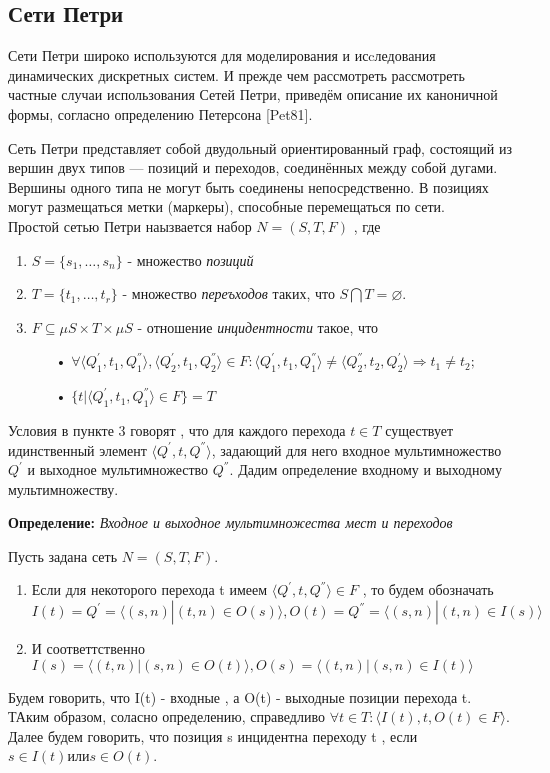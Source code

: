 \documentclass[a4paper,14pt]{article}
\begin{document}
\subsection{Сети Петри}
Сети Петри широко используются для моделирования и исcледования динамических дискретных систем. 
И прежде чем рассмотреть рассмотреть частные случаи использования Сетей Петри, приведём описание их каноничной формы, согласно определению Петерсона [Pet81].
\par Сеть Петри представляет собой двудольный ориентированный граф, состоящий из вершин двух типов — позиций и переходов, соединённых между собой дугами. Вершины одного типа не могут быть соединены непосредственно. В позициях могут размещаться метки (маркеры), способные перемещаться по сети.\\
Простой сетью Петри наызвается набор $N = (S,T,F)$ , где
\begin{enumerate}
\item $S = \lbrace s_{1},\ldots,s_{n} \rbrace$ - множество \textit{позиций}
\item $T = \lbrace t_{1},\ldots,t_{r} \rbrace$ - множество \textit{переъходов} таких, что $S \bigcap T = \varnothing$.
\item $F \subseteq \mu S \times T \times \mu S$ - отношение \textit{инцидентности} такое, что 
\begin{enumerate}
\item[•] $\forall \langle  Q_{1}^{'}, t_{1}, Q_{1}^{''} \rangle , \langle Q_{2}^{'}, t_{1}, Q_{2}^{''}\rangle \in F : \langle Q_{1}^{'}, t_{1}, Q_{1}^{''} \rangle \neq \langle Q_{2}^{''}, t_{2}, Q_{2}^{'}\rangle \Rightarrow t_{1} \neq t_{2};$
\item[•] $\lbrace t | \langle  Q_{1}^{'}, t_{1}, Q_{1}^{''} \rangle \in F \rbrace = T$
\end{enumerate}
\end{enumerate} 
Условия в пункте 3 говорят , что для каждого перехода $t \in T$ существует идинственный элемент $\langle Q^{'}, t, Q^{''} \rangle$, задающий для него входное мультимножество $Q^{'}$ и  выходное мультимножество $Q^{''}$. Дадим определение входному и выходному мультимножеству.

\textbf{Определение:}  \textit{Входное и выходное мультимножества мест и переходов}
\par Пусть задана сеть $N = (S,T,F)$.
\begin{enumerate}
\item Если для некоторого перехода t имеем $\langle Q^{'}, t, Q^{''} \rangle \in F$ , то будем обозначать $I(t) = Q^{'} = \langle (s,n)|(t,n) \in O(s) \rangle , O(t) = Q^{''} = \langle(s,n) | (t ,n) \in I(s) \rangle$
\item  И соответтственно $I(s) = \langle (t,n)|(s,n) \in O(t) \rangle , O(s) = \langle(t,n) | (s ,n) \in I(t) \rangle$
\end{enumerate}
Будем говорить, что I(t) - входные , а O(t) - выходные позиции перехода t. ТАким образом, соласно определению, справедливо $\forall t \in T : \langle I(t), t, O(t) \in F \rangle$. Далее будем говорить, что позиция s инцидентна переходу t , если $s \in I(t) или s \in O(t)$.
\end{document}
